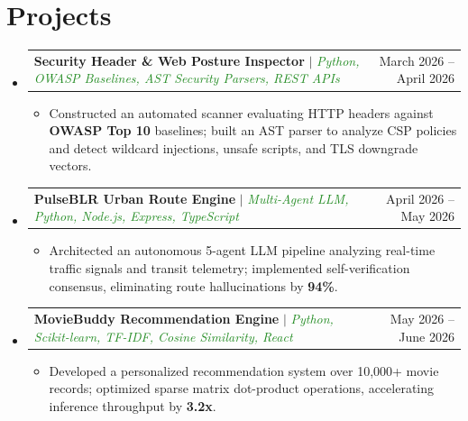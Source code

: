 \documentclass[letterpaper,10pt]{article}
\makeatletter
\newcommand{\resumeItem}[1]{
  \item\small{
    {#1 \vspace{-1.5pt}}
  }
}
\newcommand{\resumeProjectHeading}[2]{
    \vspace{-1.5pt}\item
    \begin{tabular*}{0.98\textwidth}{l@{\extracolsep{\fill}}r}
      \small#1 & #2 \\
    \end{tabular*}\vspace{-5pt}
}
\newcommand{\resumeSubHeadingListStart}{\begin{itemize}[leftmargin=0.15in, label={}]}
\newcommand{\resumeSubHeadingListEnd}{\end{itemize}}
\newcommand{\resumeItemListStart}{\begin{itemize}[leftmargin=0.18in]}
\newcommand{\resumeItemListEnd}{\end{itemize}\vspace{-3pt}}
\makeatother
\begin{document}
\section{Projects}
  \resumeSubHeadingListStart
    \resumeProjectHeading
      {\textbf{Security Header \& Web Posture Inspector} $|$ \emph{\textcolor{ForestGreen}{Python, OWASP Baselines, AST Security Parsers, REST APIs}}}{March 2026 -- April 2026}
      \resumeItemListStart
        \resumeItem{Constructed an automated scanner evaluating HTTP headers against \textbf{OWASP Top 10} baselines; built an AST parser to analyze CSP policies and detect wildcard injections, unsafe scripts, and TLS downgrade vectors.}
      \resumeItemListEnd
    \resumeProjectHeading
      {\textbf{PulseBLR Urban Route Engine} $|$ \emph{\textcolor{ForestGreen}{Multi-Agent LLM, Python, Node.js, Express, TypeScript}}}{April 2026 -- May 2026}
      \resumeItemListStart
        \resumeItem{Architected an autonomous 5-agent LLM pipeline analyzing real-time traffic signals and transit telemetry; implemented self-verification consensus, eliminating route hallucinations by \textbf{94\%}.}
      \resumeItemListEnd
    \resumeProjectHeading
      {\textbf{MovieBuddy Recommendation Engine} $|$ \emph{\textcolor{ForestGreen}{Python, Scikit-learn, TF-IDF, Cosine Similarity, React}}}{May 2026 -- June 2026}
      \resumeItemListStart
        \resumeItem{Developed a personalized recommendation system over 10,000+ movie records; optimized sparse matrix dot-product operations, accelerating inference throughput by \textbf{3.2x}.}
      \resumeItemListEnd
  \resumeSubHeadingListEnd


\end{document}
